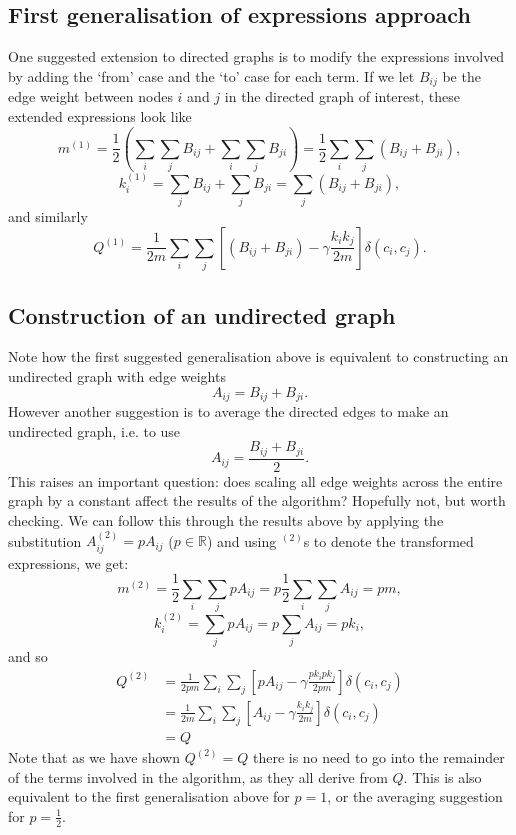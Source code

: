 \documentclass{article}
\begin{document}
\subsection{First generalisation of expressions approach}
One suggested extension to directed graphs is to modify the expressions 
involved by adding the `from' case and the `to' case for each term. 
If we let $B_{ij}$ be the edge weight between nodes $i$ and $j$ in 
the directed graph of interest, these extended expressions look like
\begin{equation}
m^{(1)} = \frac{1}{2}\left ( \sum_i\sum_jB_{ij} + \sum_i\sum_jB_{ji}\right)  = \frac{1}{2}\sum_i\sum_j \left( B_{ij} + B_{ji} \right) ,
\end{equation}
\begin{equation}
k_i^{(1)} = \sum_jB_{ij} + \sum_jB_{ji} = \sum_j{\left( B_{ij} + B_{ji} \right)},
\end{equation}
and similarly
\begin{equation}
	Q^{(1)} = \frac{1}{2m}\sum_i\sum_j\left[ \left( B_{ij} + B_{ji} \right) - \gamma \frac{k_ik_j}{2m} \right] \delta(c_i,c_j).
\end{equation}

\subsection{Construction of an undirected graph}
Note how the first suggested generalisation above is equivalent to constructing 
an undirected graph with edge weights
\begin{equation}
A_{ij} = B_{ij} + B_{ji}.
\end{equation}
However another suggestion is to average the directed edges to make
an undirected graph, i.e. to use
\begin{equation}
A_{ij} = \frac{B_{ij} + B_{ji}}{2}.
\end{equation}
This raises an important question: does scaling all edge weights across 
the entire graph by a constant affect the results of the algorithm?
Hopefully not, but worth checking.
We can follow this through the results above by applying the 
substitution $A_{ij}^{(2)} = pA_{ij}$ ($p \in \mathbb{R}$) and using ${}^{(2)}$s
to denote the transformed expressions, we get:
\begin{equation}
m^{(2)} = \frac{1}{2}\sum_i\sum_jpA_{ij}  = p\frac{1}{2}\sum_i\sum_j A_{ij} = pm ,
\end{equation}
\begin{equation}
k_i^{(2)} = \sum_j{pA_{ij}} = p\sum_j{A_{ij}} = pk_i,
\end{equation}
and so
\begin{align*}
	Q^{(2)} &= \frac{1}{2pm}\sum_i\sum_j\left[ pA_{ij} - \gamma \frac{pk_ipk_j}{2pm} \right] \delta(c_i,c_j) \\
	&= \frac{1}{2m}\sum_i\sum_j\left[ A_{ij} - \gamma \frac{k_ik_j}{2m} \right] \delta(c_i,c_j) \\
	&= Q
\end{align*}
Note that as we have shown $Q^{(2)} = Q$ there is no need to go into the remainder of the terms 
involved in the algorithm, as they all derive from $Q$.
This is also equivalent to the first generalisation above for $p = 1$, or the averaging suggestion
for $p = \frac{1}{2}$.
\end{document}
